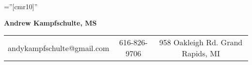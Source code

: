 \documentclass[a4paper,10pt]{article}
\begin{document}

\pagestyle{empty} %

\font\fb=''[cmr10]'' %


\par{\centering
		{\Huge \sf\bf{{Andrew Kampfschulte, MS}}
	}\par}
	
\begin{center}
\begin{tabular}{c|c|c}
andykampfschulte@gmail.com \hfill  & 616-826-9706 & \hfill 958 Oakleigh Rd. Grand Rapids, MI
\end{tabular}
\bigskip
\end{center}



\end{document}
